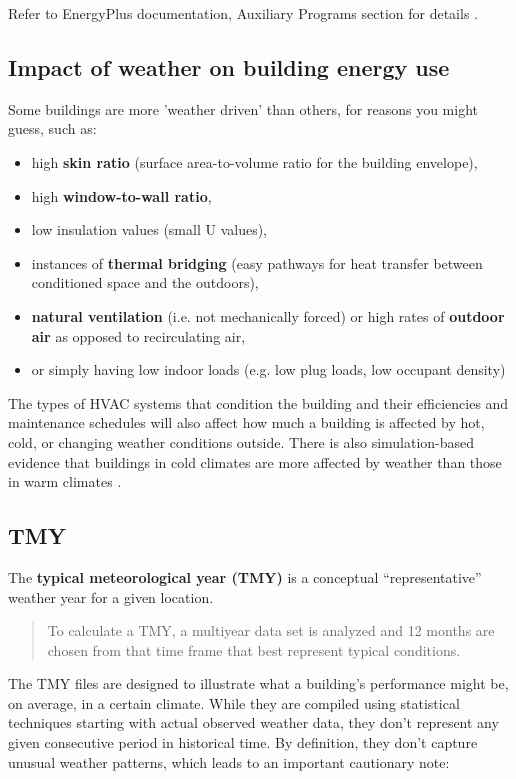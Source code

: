 \documentclass[10pt]{article}
\begin{document}
Refer to EnergyPlus documentation, Auxiliary Programs section for details \cite{EP9docs}.

\subsection{Impact of weather on building energy use}

Some buildings are more 'weather driven' than others, for reasons you might guess, such as: 
\begin{itemize}
    \item high \textbf{skin ratio} (surface area-to-volume ratio for the building envelope),
    \item high \textbf{window-to-wall ratio},
    \item low insulation values (small U values),
    \item instances of \textbf{thermal bridging} (easy pathways for heat transfer between conditioned space and the outdoors),
    \item \textbf{natural ventilation} (i.e. not mechanically forced) or high rates of \textbf{outdoor air} as opposed to recirculating air,
    \item or simply having low indoor loads (e.g. low plug loads, low occupant density)
\end{itemize}

The types of HVAC systems that condition the building and their efficiencies and maintenance schedules will also affect how much a building is affected by hot, cold, or changing weather conditions outside. There is also simulation-based evidence that buildings in cold climates are more affected by weather than those in warm climates \cite{Hong2013-ti}.

\subsection{TMY}

The \textbf{typical meteorological year (TMY)} is a conceptual ``representative'' weather year for a given location. 

\begin{quote}
To calculate a TMY, a multiyear data set is analyzed and 12 months are chosen from that time frame that best represent typical conditions. \cite{tmy-nsrdb}
\end{quote}

The TMY files are designed to illustrate what a building's performance might be, on average, in a certain climate. While they are compiled using statistical techniques starting with actual observed weather data, they don't represent any given consecutive period in historical time. By definition, they don't capture unusual weather patterns, which leads to an important cautionary note:
\end{document}
